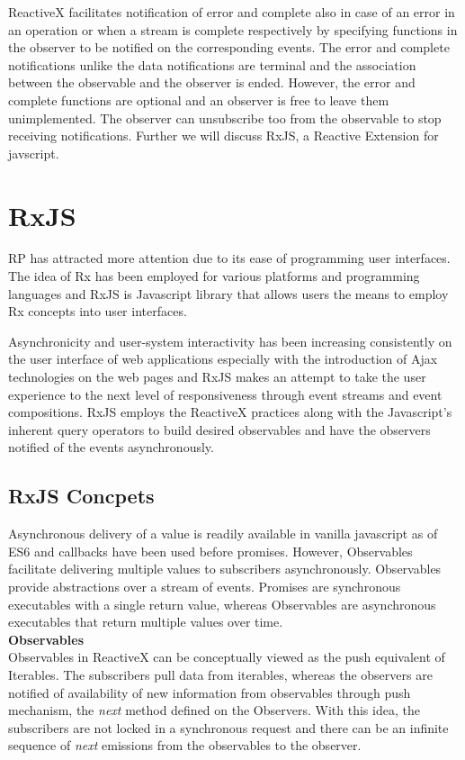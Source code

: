 ReactiveX facilitates notification of error and complete also in case of an error in an operation or when a stream is complete respectively by specifying functions in the observer to be notified on the corresponding events. The error and complete notifications unlike the data notifications are terminal and the association between the observable and the observer is ended. However, the error and complete functions are optional and an observer is free to leave them unimplemented. The observer can unsubscribe too from the observable to stop receiving notifications. Further we will discuss RxJS, a Reactive Extension for javscript.

\section{RxJS}
RP has attracted more attention due to its ease of programming user interfaces\cite{Schuster:2016:RPR:2892664.2892666}\cite{Bainomugisha:2013:SRP:2501654.2501666}. The idea of Rx has been employed for various platforms and programming languages and RxJS is Javascript library that allows users the means to employ Rx concepts into user interfaces. 

Asynchronicity and user-system interactivity \cite{Kristaly:2008:WTW:1389586.1389663} has been increasing consistently on the user interface of web applications especially with the introduction of Ajax technologies\cite{ajaxANewWayToWP} on the web pages and RxJS makes an attempt to take the user experience to the next level of responsiveness through event streams and event compositions. RxJS employs the ReactiveX practices along with the Javascript's inherent query operators to build desired observables and have the observers notified of the events asynchronously.

\subsection{RxJS Concpets}
Asynchronous delivery of a value is readily available in vanilla javascript as of ES6\cite{ECMAScript} and callbacks have been used before promises. However, Observables\cite{observable} facilitate delivering multiple values to subscribers asynchronously. Observables provide abstractions over a stream of events. Promises are synchronous executables with a single return value, whereas Observables are asynchronous executables that return multiple values over time. 
\\
\textbf{Observables}
\\
Observables in ReactiveX can be conceptually viewed as the push equivalent of Iterables\cite{reactiveX}. The subscribers pull data from iterables, whereas the observers are notified of availability of new information from observables through push mechanism, the \textit{next} method defined on the Observers. With this idea, the subscribers are not locked in a synchronous request and there can be an infinite sequence of \textit{next} emissions from the observables to the observer.

